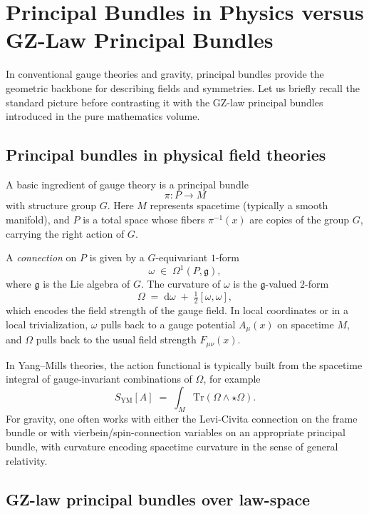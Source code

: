 \documentclass[11pt]{book}
\newcommand{\Base}{\ensuremath{M}}
\newcommand{\Bundle}{\ensuremath{P}}
\newcommand{\Group}{\ensuremath{G}}
\newcommand{\Conn}{\ensuremath{\omega}}
\newcommand{\Curv}{\ensuremath{\Omega}}
\theoremstyle{plain}
\theoremstyle{definition}
\theoremstyle{remark}
\begin{document}
\section{Principal Bundles in Physics versus GZ-Law Principal Bundles}
\label{sec:phys-vs-law-bundles}



In conventional gauge theories and gravity, principal bundles provide
the geometric backbone for describing fields and symmetries. Let us
briefly recall the standard picture before contrasting it with the
GZ-law principal bundles introduced in the pure mathematics volume.

\subsection{Principal bundles in physical field theories}

A basic ingredient of gauge theory is a principal bundle
\[
   \pi \colon \Bundle \longrightarrow \Base
\]
with structure group $\Group$. Here $\Base$ represents spacetime
(typically a smooth manifold), and $\Bundle$ is a total space whose
fibers $\pi^{-1}(x)$ are copies of the group $\Group$, carrying the
right action of $\Group$.

A \emph{connection} on $\Bundle$ is given by a $\Group$-equivariant
$1$-form
\[
   \Conn \;\in\; \Omega^1(\Bundle,\mathfrak{g}),
\]
where $\mathfrak{g}$ is the Lie algebra of $\Group$. The curvature of
$\Conn$ is the $\mathfrak{g}$-valued $2$-form
\[
   \Curv \;=\; \mathrm{d}\Conn \;+\; \tfrac{1}{2}[\Conn,\Conn],
\]
which encodes the field strength of the gauge field. In local
coordinates or in a local trivialization, $\Conn$ pulls back to a gauge
potential $A_\mu(x)$ on spacetime $\Base$, and $\Curv$ pulls back to the
usual field strength $F_{\mu\nu}(x)$.

In Yang--Mills theories, the action functional is typically built from
the spacetime integral of gauge-invariant combinations of $\Curv$,
for example
\[
   S_{\mathrm{YM}}[A] \;=\; \int_{\Base} \mathrm{Tr}(\Curv \wedge \star \Curv).
\]
For gravity, one often works with either the Levi-Civita connection on
the frame bundle or with vierbein/spin-connection variables on an
appropriate principal bundle, with curvature encoding spacetime
curvature in the sense of general relativity.

\subsection{GZ-law principal bundles over law-space}
\end{document}
